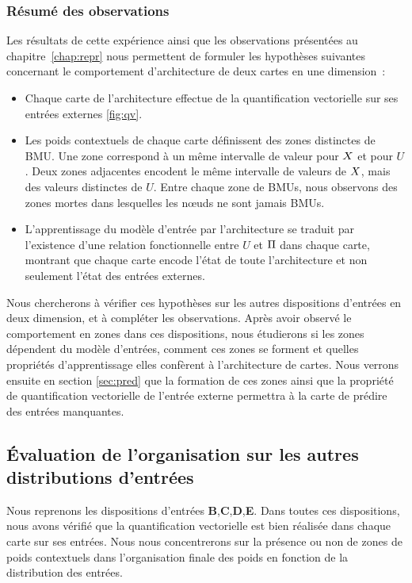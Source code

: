 \documentclass[../main]{subfiles}
\begin{document}
\subsubsection{Résumé des observations}

Les résultats de cette expérience ainsi que les observations présentées au chapitre~\ref{chap:repr} nous permettent de formuler les hypothèses suivantes concernant le comportement d'architecture de deux cartes en une dimension~:

\begin{itemize}
	\item Chaque carte de l'architecture effectue de la quantification vectorielle sur ses entrées externes \ref{fig:qv}. 
	\item Les poids contextuels de chaque carte définissent des zones distinctes de BMU. 
	Une zone correspond à un même intervalle de valeur pour $X$ et pour $U$. Deux zones adjacentes encodent le même intervalle de valeurs de $X$, mais des valeurs distinctes de $U$.
	Entre chaque zone de BMUs, nous observons des zones mortes dans lesquelles les n\oe{}uds ne sont jamais BMUs. 
	
	\item L'apprentissage du modèle d'entrée par l'architecture se traduit par l'existence d'une relation fonctionnelle entre $U$ et $\Pi$ dans chaque carte, montrant que chaque carte encode l'état de toute l'architecture et non seulement l'état des entrées externes.
\end{itemize}

Nous chercherons à vérifier ces hypothèses sur les autres dispositions d'entrées en deux dimension, et à compléter les observations.
Après avoir observé le comportement en zones dans ces dispositions, nous étudierons si les zones dépendent du modèle d'entrées, comment ces zones se forment et quelles propriétés d'apprentissage elles confèrent à l'architecture de cartes.
Nous verrons ensuite en section \ref{sec:pred} que la formation de ces zones ainsi que la propriété de quantification vectorielle de l'entrée externe permettra à la carte de prédire des entrées manquantes.

\subsection{\'Evaluation de l'organisation sur les autres distributions d'entrées}

Nous reprenons les dispositions d'entrées \textbf{B},\textbf{C},\textbf{D},\textbf{E}.
Dans toutes ces dispositions, nous avons vérifié que la quantification vectorielle est bien réalisée dans chaque carte sur ses entrées.
Nous nous concentrerons sur la présence ou non de zones de poids contextuels dans l'organisation finale des poids en fonction de la distribution des entrées.
\end{document}
